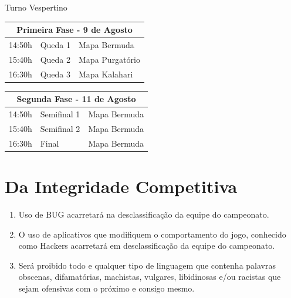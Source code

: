 \begin{enumerate}[start=1,label={\bfseries Art. \arabic*$^\circ$ - }, resume]
    \begin{center}
        Turno Vespertino
    \end{center}
    \begin{multicols}{2}
        \begin{flushleft}
            \begin{tabular}{l l l}
                \hline
                \multicolumn{3}{c}{Primeira Fase - 9 de Agosto}\\
                \hline
                14:50h & Queda 1 & Mapa Bermuda \\
                15:40h & Queda 2 & Mapa Purgatório \\
                16:30h & Queda 3 & Mapa Kalahari\\
                \hline
            \end{tabular}
        \end{flushleft}

        \begin{flushleft}
            \begin{tabular}{l l l}
                \hline
                \multicolumn{3}{c}{Segunda Fase - 11 de Agosto}\\
                \hline
                14:50h & Semifinal 1 & Mapa Bermuda\\
                15:40h & Semifinal 2 & Mapa Bermuda\\
                16:30h & Final & Mapa Bermuda\\
                \hline
            \end{tabular}
        \end{flushleft}
    \end{multicols}
\end{enumerate}

\section*{Da Integridade Competitiva}

\begin{enumerate}[start=1,label={\bfseries Art. \arabic*$^\circ$ - }, resume]
    \item Uso de BUG acarretará na desclassificação da equipe do campeonato.
    \item O uso de aplicativos que modifiquem o comportamento do jogo, conhecido
        como Hackers acarretará em desclassificação da equipe do campeonato.
    \item Será proibido todo e qualquer tipo de linguagem
        que contenha palavras obscenas, difamatórias, machistas, vulgares, libidinosas
        e/ou racistas que sejam ofensivas com o próximo e consigo mesmo.
\end{enumerate}

